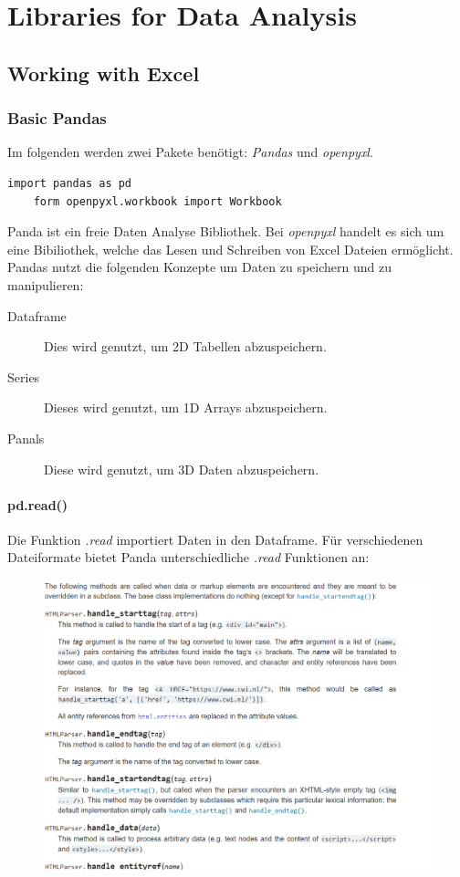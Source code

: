 \section{Libraries for Data Analysis}
\subsection{Working with Excel}
\subsubsection{Basic Pandas}
Im folgenden werden zwei Pakete benötigt: \textit{Pandas} und \textit{openpyxl}. \\
\begin{lstlisting}[style=python]
	import pandas as pd
	form openpyxl.workbook import Workbook
\end{lstlisting}
Panda ist ein freie Daten Analyse Bibliothek. Bei \textit{openpyxl} handelt es sich um eine Bibiliothek, welche das Lesen und Schreiben von Excel Dateien ermöglicht.\\

Pandas nutzt die folgenden Konzepte um Daten zu speichern und zu manipulieren:
\begin{description}
	\item[Dataframe] Dies wird genutzt, um 2D Tabellen abzuspeichern. 
	\item[Series] Dieses wird genutzt, um 1D Arrays abzuspeichern.
	\item[Panals] Diese wird genutzt, um 3D Daten abzuspeichern.
\end{description}

\paragraph*{pd.read()}
Die Funktion \textit{.read} importiert Daten in den Dataframe. Für verschiedenen Dateiformate bietet Panda unterschiedliche \textit{.read} Funktionen an:
\begin{figure}[H]
	\centering
	\includegraphics[scale = 0.3]{attachment/chapter_3/Scc077}
\end{figure} 

